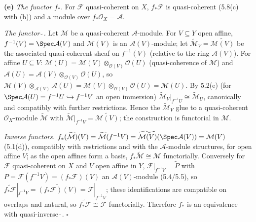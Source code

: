 \documentclass[11pt]{article}
\begin{document}
\textbf{(e)} \emph{The functor $f_*$.} For $\mathcal F$ quasi-coherent on $X$, $f_*\mathcal F$ is quasi-coherent (5.8(c) with (b)) and a module over $f_*\mathcal O_X=\mathcal A$.

\emph{The functor $\widetilde{\ }$.} Let $\mathcal M$ be a quasi-coherent $\mathcal A$-module. For $V\subseteq Y$ open affine, $f^{-1}(V)=\Spec\mathcal A(V)$ and $\mathcal M(V)$ is an $\mathcal A(V)$-module; let $\widetilde{\mathcal M}_V=\widetilde{\mathcal M(V)}$ be the associated quasi-coherent sheaf on $f^{-1}(V)$ (relative to the ring $\mathcal A(V)$). For affine $U\subseteq V$: $\mathcal M(U)=\mathcal M(V)\otimes_{\mathcal O(V)}\mathcal O(U)$ (quasi-coherence of $\mathcal M$) and $\mathcal A(U)=\mathcal A(V)\otimes_{\mathcal O(V)}\mathcal O(U)$, so $\mathcal M(V)\otimes_{\mathcal A(V)}\mathcal A(U)=\mathcal M(V)\otimes_{\mathcal O(V)}\mathcal O(U)=\mathcal M(U)$. By 5.2(e) (for $\Spec\mathcal A(U)=f^{-1}U\hookrightarrow f^{-1}V$ an open immersion) $\widetilde{\mathcal M}_V|_{f^{-1}U}\cong\widetilde{\mathcal M}_U$, canonically and compatibly with further restrictions. Hence the $\widetilde{\mathcal M}_V$ glue to a quasi-coherent $\mathcal O_X$-module $\widetilde{\mathcal M}$ with $\widetilde{\mathcal M}|_{f^{-1}V}=\widetilde{\mathcal M(V)}$; the construction is functorial in $\mathcal M$.

\emph{Inverse functors.} $f_*(\widetilde{\mathcal M})(V)=\widetilde{\mathcal M}(f^{-1}V)=\widetilde{\mathcal M(V)}(\Spec\mathcal A(V))=\mathcal M(V)$ (5.1(d)), compatibly with restrictions and with the $\mathcal A$-module structures, for open affine $V$; as the open affines form a basis, $f_*\widetilde{\mathcal M}\cong\mathcal M$ functorially. Conversely for $\mathcal F$ quasi-coherent on $X$ and $V$ open affine in $Y$, $\mathcal F|_{f^{-1}V}=\widetilde P$ with $P=\mathcal F(f^{-1}V)=(f_*\mathcal F)(V)$ an $\mathcal A(V)$-module (5.4/5.5), so $\widetilde{f_*\mathcal F}|_{f^{-1}V}=\widetilde{(f_*\mathcal F)(V)}=\mathcal F|_{f^{-1}V}$; these identifications are compatible on overlaps and natural, so $\widetilde{f_*\mathcal F}\cong\mathcal F$ functorially. Therefore $f_*$ is an equivalence with quasi-inverse $\widetilde{\ }$. \hfill$\square$
\end{document}
